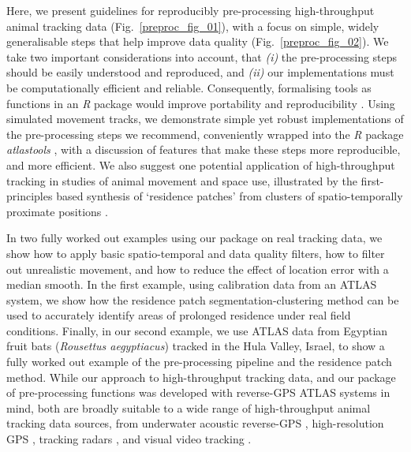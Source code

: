 Here, we present guidelines for reproducibly pre-processing high-throughput animal tracking data (Fig.~\ref{preproc_fig_01}), with a focus on simple, widely generalisable steps that help improve data quality (Fig.~\ref{preproc_fig_02}).
We take two important considerations into account, that \textit{(i)} the pre-processing steps should be easily understood and reproduced, and \textit{(ii)} our implementations must be computationally efficient and reliable.
Consequently, formalising tools as functions in an \textit{R} package would improve portability and reproducibility \citep{marwick2018, wickham2015}.
Using simulated movement tracks, we demonstrate simple yet robust implementations of the pre-processing steps we recommend, conveniently wrapped into the \textit{R} package \textit{atlastools} \citep{gupte2020a}, with a discussion of features that make these steps more reproducible, and more efficient.
We also suggest one potential application of high-throughput tracking in studies of animal movement and space use, illustrated by the first-principles based synthesis of `residence patches' from clusters of spatio-temporally proximate positions \citep[\textit{sensu}][]{bijleveld2016, oudman2018, barraquand2008}.

In two fully worked out examples using our package on real tracking data, we show how to apply basic spatio-temporal and data quality filters, how to filter out unrealistic movement, and how to reduce the effect of location error with a median smooth.
In the first example, using calibration data from an ATLAS system, we show how the residence patch segmentation-clustering method can be used to accurately identify areas of prolonged residence under real field conditions.
Finally, in our second example, we use ATLAS data from Egyptian fruit bats (\textit{Rousettus aegyptiacus}) tracked in the Hula Valley, Israel, to show a fully worked out example of the pre-processing pipeline and the residence patch method.
While our approach to high-throughput tracking data, and our package of pre-processing functions was developed with reverse-GPS ATLAS systems in mind, both are broadly suitable to a wide range of high-throughput animal tracking data sources, from underwater acoustic reverse-GPS \citep{baktoft2019, baktoft2017, jung2015, aspillaga2021, aspillaga2021a}, high-resolution GPS \citep{strandburg-peshkin2015, papageorgiou2019, harel2016, klarevas-irby2021}, tracking radars \citep{horvitz2014}, and visual video tracking \citep{rathore2020, perez-escudero2014}.

